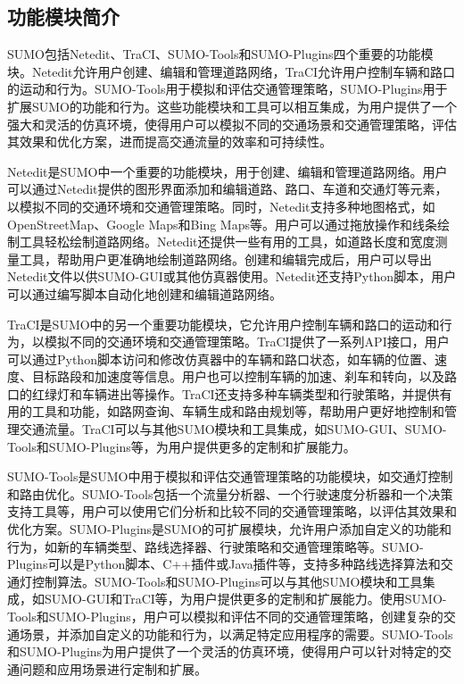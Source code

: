 \subsection{功能模块简介}
SUMO包括Netedit、TraCI、SUMO-Tools和SUMO-Plugins四个重要的功能模块。Netedit允许用户创建、编辑和管理道路网络，TraCI允许用户控制车辆和路口的运动和行为。SUMO-Tools用于模拟和评估交通管理策略，SUMO-Plugins用于扩展SUMO的功能和行为。这些功能模块和工具可以相互集成，为用户提供了一个强大和灵活的仿真环境，使得用户可以模拟不同的交通场景和交通管理策略，评估其效果和优化方案，进而提高交通流量的效率和可持续性。

Netedit是SUMO中一个重要的功能模块，用于创建、编辑和管理道路网络。用户可以通过Netedit提供的图形界面添加和编辑道路、路口、车道和交通灯等元素，以模拟不同的交通环境和交通管理策略。同时，Netedit支持多种地图格式，如OpenStreetMap、Google Maps和Bing Maps等。用户可以通过拖放操作和线条绘制工具轻松绘制道路网络。Netedit还提供一些有用的工具，如道路长度和宽度测量工具，帮助用户更准确地绘制道路网络。创建和编辑完成后，用户可以导出Netedit文件以供SUMO-GUI或其他仿真器使用。Netedit还支持Python脚本，用户可以通过编写脚本自动化地创建和编辑道路网络。

TraCI是SUMO中的另一个重要功能模块，它允许用户控制车辆和路口的运动和行为，以模拟不同的交通环境和交通管理策略。TraCI提供了一系列API接口，用户可以通过Python脚本访问和修改仿真器中的车辆和路口状态，如车辆的位置、速度、目标路段和加速度等信息。用户也可以控制车辆的加速、刹车和转向，以及路口的红绿灯和车辆进出等操作。TraCI还支持多种车辆类型和行驶策略，并提供有用的工具和功能，如路网查询、车辆生成和路由规划等，帮助用户更好地控制和管理交通流量。TraCI可以与其他SUMO模块和工具集成，如SUMO-GUI、SUMO-Tools和SUMO-Plugins等，为用户提供更多的定制和扩展能力。

SUMO-Tools是SUMO中用于模拟和评估交通管理策略的功能模块，如交通灯控制和路由优化。SUMO-Tools包括一个流量分析器、一个行驶速度分析器和一个决策支持工具等，用户可以使用它们分析和比较不同的交通管理策略，以评估其效果和优化方案。SUMO-Plugins是SUMO的可扩展模块，允许用户添加自定义的功能和行为，如新的车辆类型、路线选择器、行驶策略和交通管理策略等。SUMO-Plugins可以是Python脚本、C++插件或Java插件等，支持多种路线选择算法和交通灯控制算法。SUMO-Tools和SUMO-Plugins可以与其他SUMO模块和工具集成，如SUMO-GUI和TraCI等，为用户提供更多的定制和扩展能力。使用SUMO-Tools和SUMO-Plugins，用户可以模拟和评估不同的交通管理策略，创建复杂的交通场景，并添加自定义的功能和行为，以满足特定应用程序的需要。SUMO-Tools和SUMO-Plugins为用户提供了一个灵活的仿真环境，使得用户可以针对特定的交通问题和应用场景进行定制和扩展。



